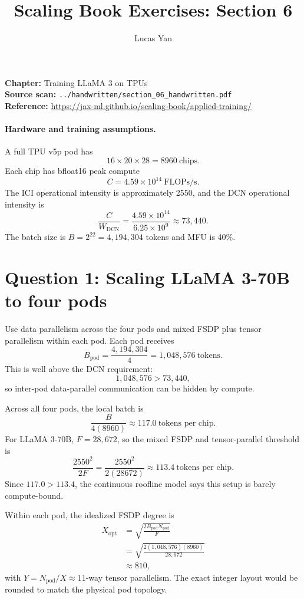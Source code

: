 \documentclass[11pt]{article}
\title{Scaling Book Exercises: Section 6}
\author{Lucas Yan}
\date{}
\begin{document}
\maketitle

\noindent
\textbf{Chapter:} Training LLaMA 3 on TPUs\\
\textbf{Source scan:} \texttt{../handwritten/section\_06\_handwritten.pdf}\\
\textbf{Reference:} \url{https://jax-ml.github.io/scaling-book/applied-training/}

\paragraph{Hardware and training assumptions.}
A full TPU v5p pod has
\[
16\times20\times28=8960\ \text{chips}.
\]
Each chip has bfloat16 peak compute
\[
C=4.59\times10^{14}\ \text{FLOPs/s}.
\]
The ICI operational intensity is approximately 2550, and the DCN operational
intensity is
\[
\frac{C}{W_{\mathrm{DCN}}}
=\frac{4.59\times10^{14}}{6.25\times10^9}
\approx73{,}440.
\]
The batch size is $B=2^{22}=4{,}194{,}304$ tokens and MFU is 40\%.

\section*{Question 1: Scaling LLaMA 3-70B to four pods}

Use data parallelism across the four pods and mixed FSDP plus tensor
parallelism within each pod. Each pod receives
\[
B_{\mathrm{pod}}=\frac{4{,}194{,}304}{4}
=1{,}048{,}576\ \text{tokens}.
\]
This is well above the DCN requirement:
\[
1{,}048{,}576>73{,}440,
\]
so inter-pod data-parallel communication can be hidden by compute.

Across all four pods, the local batch is
\[
\frac{B}{4(8960)}
\approx117.0\ \text{tokens per chip}.
\]
For LLaMA 3-70B, $F=28{,}672$, so the mixed FSDP and tensor-parallel
threshold is
\[
\frac{2550^2}{2F}
=\frac{2550^2}{2(28672)}
\approx113.4\ \text{tokens per chip}.
\]
Since $117.0>113.4$, the continuous roofline model says this setup is barely
compute-bound.

Within each pod, the idealized FSDP degree is
\begin{align*}
X_{\mathrm{opt}}
&=\sqrt{\frac{2B_{\mathrm{pod}}N_{\mathrm{pod}}}{F}}\\
&=\sqrt{\frac{2(1{,}048{,}576)(8960)}{28{,}672}}\\
&\approx810,
\end{align*}
with $Y=N_{\mathrm{pod}}/X\approx11$-way tensor parallelism. The exact
integer layout would be rounded to match the physical pod topology.
\end{document}
